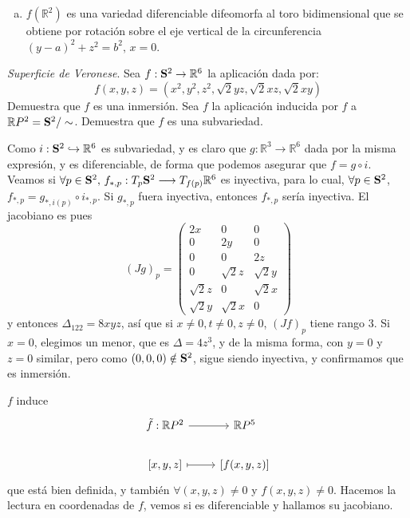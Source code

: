 \begin{ejer}
\begin{enumerate}[a)]
\begin{sol}
        Concluimos as\'i que $rang(Jf)_p=2$, entonces $f$ es inmersi\'on, pero como $f$ no es inyectiva, no podemos decir que $f$ sea subvariedad. 

        Si tomamos $U_1 = (0,2\pi)\times (0,2\pi)$, $f|_{U_1}$ s\'i es inyectiva, y si tomamos $U_2 = (-\pi , \pi )\times (-\pi, \pi)$, de forma que $f(U_1) \cup f(U_2)$ es casi todo el toro excepto $f(\pi, 0)$ y $f(0,\pi)$. Eligiendo entornos de estos puntos, donde $f$ es inyectiva podemos elegir un tercer dominio disconexo, cubriendo todo el toro, que falta ver que es un atlas. 

        En ese caso, $f$ es subvariedad en $U_1,U_2,U_3$.
    \end{sol}
    \item $f(\mathbb R^2)$ es una variedad diferenciable difeomorfa al toro bidimensional que se obtiene por rotaci\'on sobre el eje vertical de la circunferencia $(y - a)^2 + z^2 = b^2, \, x = 0$.
\end{enumerate}
\end{ejer}
\begin{ejer}
    [3.8] \textit{Superficie de Veronese}. Sea $f : \bold S^2 \to \mathbb R^6$ la aplicaci\'on dada por: 
    $$f(x, y, z) = (x^2, y^2, z^2, \sqrt{2}yz, \sqrt{2}xz, \sqrt{2}xy )$$ Demuestra que $f$ es una inmersi\'on. Sea $f$ la aplicaci\'on inducida por $f$ a $\mathbb RP^2= \bold S^2/\sim$. Demuestra que $f$ es una subvariedad.
\end{ejer}
\begin{sol}
    Como $i : \bold S^2 \hookrightarrow \mathbb R^6$ es subvariedad, y es claro que $g: \mathbb R^3 \to \mathbb R^6$ dada por la misma expresi\'on, y es diferenciable, de forma que podemos asegurar que $f=g\circ i$. Veamos si $\forall p \in \bold S^2, \, f_{*,p}:T_p\bold S^2 \longrightarrow T_{f(p)}\mathbb R^6$ es inyectiva, para lo cual, $\forall p \in \bold S^2$, $f_{*,p} = g_{*,i(p)} \circ i_{*,p}$. Si $g_{*,p}$ fuera inyectiva, entonces $f_{*,p}$ ser\'ia inyectiva. El jacobiano es pues
    $$(Jg)_p = \begin{pmatrix}
        2x & 0 & 0 \\ 0 & 2y & 0 \\ 0 & 0 & 2z \\ 0 & \sqrt{2}z & \sqrt{2}y \\ \sqrt{2}z & 0 & \sqrt{2}x \\ \sqrt{2}y & \sqrt{2}x & 0
    \end{pmatrix}$$
    y entonces $\Delta_{122} = 8xyz$, as\'i que si $x\neq 0, t\neq 0, z\neq0$, $(Jf)_p$ tiene rango 3. Si $x=0$, elegimos un menor, que es $\Delta = 4z^3$, y de la misma forma, con $y=0$ y $z=0$ similar, pero como $(0,0,0) \notin \bold S^2$, sigue siendo inyectiva, y confirmamos que es inmersi\'on.

    $f$ induce 
    $$\bt \tilde f : \mathbb RP^2 \arrow{r} & \mathbb RP^5 \\ \left[x,y,z\right] \arrow[mapsto]{r} & \left[f(x,y,z)\right] \et$$
    que est\'a bien definida, y tambi\'en $\forall (x,y,z) \neq 0$ y $f(x,y,z)\neq 0$. Hacemos la lectura en coordenadas de $f$, vemos si es diferenciable y hallamos su jacobiano.
\end{sol}
